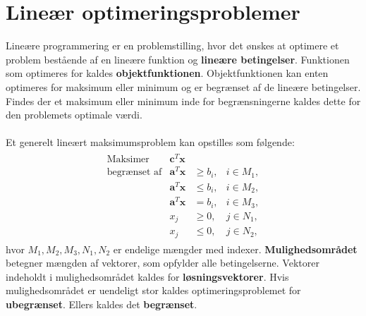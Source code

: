 \chapter{Lineær optimeringsproblemer}
%
Lineære programmering er en problemstilling, hvor det ønskes at optimere et problem bestående af en lineære funktion og \textbf{lineære betingelser}.
Funktionen som optimeres for kaldes \textbf{objektfunktionen}.
Objektfunktionen kan enten optimeres for maksimum eller minimum og er begrænset af de lineære betingelser.
Findes der et maksimum eller minimum inde for begrænsningerne kaldes dette for den problemets optimale værdi.
\\\\
Et generelt lineært maksimumsproblem kan opstilles som følgende:
%
\begin{align*}
\begin{array}{lrll}
\text{Maksimer}		&\textbf{c}^T\textbf{x}	&			&\\
\text{begrænset af}	&\textbf{a}^T\textbf{x}	&\geq b_i,	&i \in M_1,\\
					&\textbf{a}^T\textbf{x}	&\leq b_i,	&i \in M_2,\\
					&\textbf{a}^T\textbf{x}	& = b_i,	&i \in M_3,\\
					&x_j					&\geq 0,	&j \in N_1,\\
					&x_j					&\leq 0,	&j \in N_2,
\end{array}
\end{align*}
%
hvor $M_1, M_2, M_3, N_1, N_2$ er endelige mængder med indexer.
\textbf{Mulighedsområdet} betegner mængden af vektorer, som opfylder alle betingelserne.
Vektorer indeholdt i mulighedsområdet kaldes for \textbf{løsningsvektorer}.
Hvis mulighedsområdet er uendeligt stor kaldes optimeringsproblemet for \textbf{ubegrænset}.
Ellers kaldes det \textbf{begrænset}.\\\\
%
